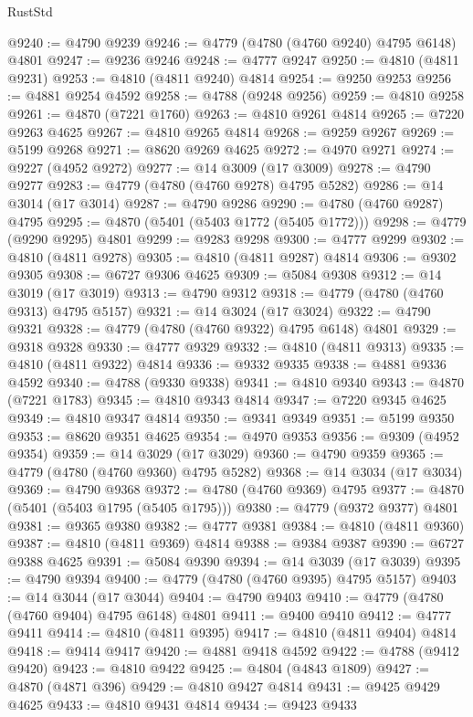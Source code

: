\begin{lexlean}{RustStd}
\begin{coremodule}
@9240 := @4790 @9239
@9246 := @4779 (@4780 (@4760 @9240) @4795 @6148) @4801
@9247 := @9236 @9246
@9248 := @4777 @9247
@9250 := @4810 (@4811 @9231)
@9253 := @4810 (@4811 @9240) @4814
@9254 := @9250 @9253
@9256 := @4881 @9254 @4592
@9258 := @4788 (@9248 @9256)
@9259 := @4810 @9258
@9261 := @4870 (@7221 @1760)
@9263 := @4810 @9261 @4814
@9265 := @7220 @9263 @4625
@9267 := @4810 @9265 @4814
@9268 := @9259 @9267
@9269 := @5199 @9268
@9271 := @8620 @9269 @4625
@9272 := @4970 @9271
@9274 := @9227 (@4952 @9272)
@9277 := @14 @3009 (@17 @3009)
@9278 := @4790 @9277
@9283 := @4779 (@4780 (@4760 @9278) @4795 @5282)
@9286 := @14 @3014 (@17 @3014)
@9287 := @4790 @9286
@9290 := @4780 (@4760 @9287) @4795
@9295 := @4870 (@5401 (@5403 @1772 (@5405 @1772)))
@9298 := @4779 (@9290 @9295) @4801
@9299 := @9283 @9298
@9300 := @4777 @9299
@9302 := @4810 (@4811 @9278)
@9305 := @4810 (@4811 @9287) @4814
@9306 := @9302 @9305
@9308 := @6727 @9306 @4625
@9309 := @5084 @9308
@9312 := @14 @3019 (@17 @3019)
@9313 := @4790 @9312
@9318 := @4779 (@4780 (@4760 @9313) @4795 @5157)
@9321 := @14 @3024 (@17 @3024)
@9322 := @4790 @9321
@9328 := @4779 (@4780 (@4760 @9322) @4795 @6148) @4801
@9329 := @9318 @9328
@9330 := @4777 @9329
@9332 := @4810 (@4811 @9313)
@9335 := @4810 (@4811 @9322) @4814
@9336 := @9332 @9335
@9338 := @4881 @9336 @4592
@9340 := @4788 (@9330 @9338)
@9341 := @4810 @9340
@9343 := @4870 (@7221 @1783)
@9345 := @4810 @9343 @4814
@9347 := @7220 @9345 @4625
@9349 := @4810 @9347 @4814
@9350 := @9341 @9349
@9351 := @5199 @9350
@9353 := @8620 @9351 @4625
@9354 := @4970 @9353
@9356 := @9309 (@4952 @9354)
@9359 := @14 @3029 (@17 @3029)
@9360 := @4790 @9359
@9365 := @4779 (@4780 (@4760 @9360) @4795 @5282)
@9368 := @14 @3034 (@17 @3034)
@9369 := @4790 @9368
@9372 := @4780 (@4760 @9369) @4795
@9377 := @4870 (@5401 (@5403 @1795 (@5405 @1795)))
@9380 := @4779 (@9372 @9377) @4801
@9381 := @9365 @9380
@9382 := @4777 @9381
@9384 := @4810 (@4811 @9360)
@9387 := @4810 (@4811 @9369) @4814
@9388 := @9384 @9387
@9390 := @6727 @9388 @4625
@9391 := @5084 @9390
@9394 := @14 @3039 (@17 @3039)
@9395 := @4790 @9394
@9400 := @4779 (@4780 (@4760 @9395) @4795 @5157)
@9403 := @14 @3044 (@17 @3044)
@9404 := @4790 @9403
@9410 := @4779 (@4780 (@4760 @9404) @4795 @6148) @4801
@9411 := @9400 @9410
@9412 := @4777 @9411
@9414 := @4810 (@4811 @9395)
@9417 := @4810 (@4811 @9404) @4814
@9418 := @9414 @9417
@9420 := @4881 @9418 @4592
@9422 := @4788 (@9412 @9420)
@9423 := @4810 @9422
@9425 := @4804 (@4843 @1809)
@9427 := @4870 (@4871 @396)
@9429 := @4810 @9427 @4814
@9431 := @9425 @9429 @4625
@9433 := @4810 @9431 @4814
@9434 := @9423 @9433

\end{coremodule}
\end{lexlean}
